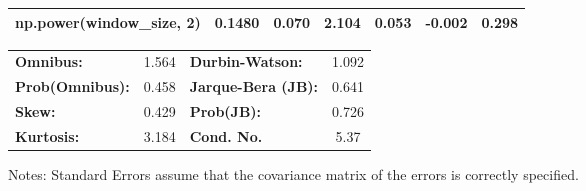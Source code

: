 \begin{center}
\begin{tabular}{lcccccc}
\textbf{np.power(window\_size, 2)}            &       0.1480  &        0.070     &     2.104  &         0.053        &       -0.002    &        0.298     \\
\bottomrule
\end{tabular}
\begin{tabular}{lclc}
\textbf{Omnibus:}       &  1.564 & \textbf{  Durbin-Watson:     } &    1.092  \\
\textbf{Prob(Omnibus):} &  0.458 & \textbf{  Jarque-Bera (JB):  } &    0.641  \\
\textbf{Skew:}          &  0.429 & \textbf{  Prob(JB):          } &    0.726  \\
\textbf{Kurtosis:}      &  3.184 & \textbf{  Cond. No.          } &     5.37  \\
\bottomrule
\end{tabular}
\end{center}

Notes: \newline
 [1] Standard Errors assume that the covariance matrix of the errors is correctly specified.